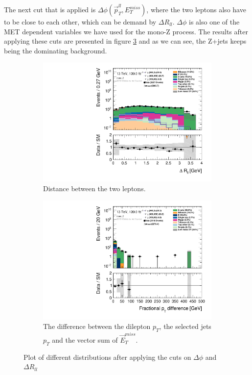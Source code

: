 The next cut that is applied is $\Delta \phi (\Vec{p}_T^{ll}, E_T^{miss})$, where the two leptons also have to be close to each other, which can be demand by $\Delta R_{ll}$. $\Delta \phi$ is also one of the MET dependent variables we have used for the mono-Z process. The results after applying these cuts are presented in figure \ref{fig:stepsDM3} and as we can see, the Z+jets keeps being the dominating background. 




\begin{figure}[H]
    \centering
    \begin{subfigure}[t!]{0.49\textwidth}
        \includegraphics[width=\textwidth]{Figures/MonoZcuts/hist1d_deltaRll_mono_Z.pdf}
    \caption{Distance between the two leptons.}
    \label{fig:delRllDM}
    \end{subfigure}
    \begin{subfigure}[t!]{0.49\textwidth}
        \includegraphics[width=\textwidth]{Figures/MonoZcuts/hist1d_pTdiff_mono_Z.pdf}
    \caption{The difference between the dilepton $p_T$, the selected jets $p_T$ and the vector sum of $\Vec{E}_T^{miss}$.}
    \label{fig:pTdiffDM}
    \end{subfigure}
    \caption{Plot of different distributions after applying the cuts on $\Delta \phi$ and $\Delta R_{ll}$}
    \label{fig:stepsDM3}
\end{figure}


